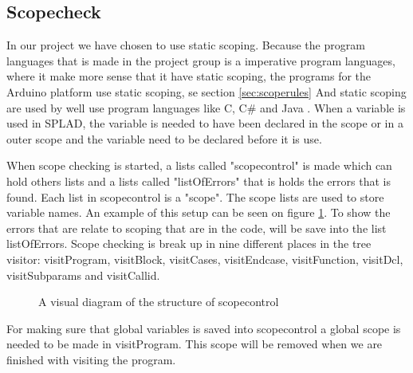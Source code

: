 \subsection{Scopecheck}
\label{sec:scopecheck}
In our project we have chosen to use static scoping. Because the program languages that is made in the project group is a imperative program languages, where it make more sense that it have static scoping, the programs for the Arduino platform use static scoping, se section \ref{sec:scoperules}
And static scoping are used by well use program languages like C, C\# and Java \citep{ProgrammingCommunityIndex}.
When a variable is used in SPLAD, the variable is needed to have been declared in the scope or in a outer scope and the variable need to be declared before it is use.

When scope checking is started, a lists called "scopecontrol" is made which can hold others lists and a lists called "listOfErrors" that is holds the errors that is found. Each list in scopecontrol is a "scope". The scope lists are used to store variable names. An example of this setup can be seen on figure \ref{fig:scopediagram}. To show the errors that are relate to scoping that are in the code, will be save into the list listOfErrors. Scope checking is break up in nine different places in the tree visitor: visitProgram, visitBlock, visitCases, visitEndcase, visitFunction, visitDcl, visitSubparams and visitCallid.

\begin{figure}[H]

\centering
{}
\caption{A visual diagram of the structure of scopecontrol}
\label{fig:scopediagram}
\end{figure}

For making sure that global variables is saved into scopecontrol a global scope is needed to be made in visitProgram. This scope will be removed when we are finished with visiting the program.

